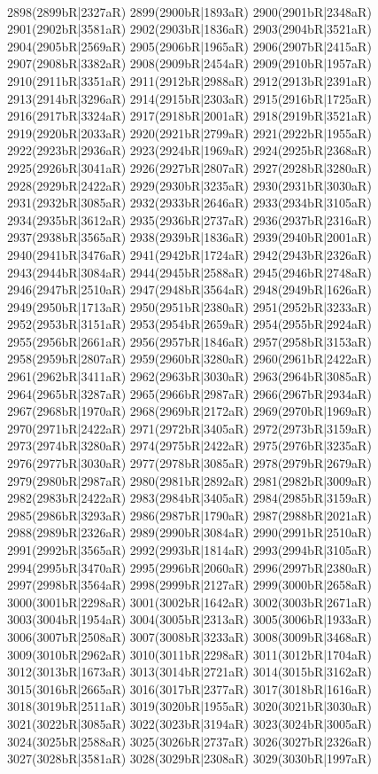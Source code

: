 \\2898(2899bR|2327aR) 2899(2900bR|1893aR) 2900(2901bR|2348aR) 2901(2902bR|3581aR) 2902(2903bR|1836aR) 2903(2904bR|3521aR) 2904(2905bR|2569aR) 2905(2906bR|1965aR) 2906(2907bR|2415aR) \\2907(2908bR|3382aR) 2908(2909bR|2454aR) 2909(2910bR|1957aR) 2910(2911bR|3351aR) 2911(2912bR|2988aR) 2912(2913bR|2391aR) 2913(2914bR|3296aR) 2914(2915bR|2303aR) 2915(2916bR|1725aR) \\2916(2917bR|3324aR) 2917(2918bR|2001aR) 2918(2919bR|3521aR) 2919(2920bR|2033aR) 2920(2921bR|2799aR) 2921(2922bR|1955aR) 2922(2923bR|2936aR) 2923(2924bR|1969aR) 2924(2925bR|2368aR) \\2925(2926bR|3041aR) 2926(2927bR|2807aR) 2927(2928bR|3280aR) 2928(2929bR|2422aR) 2929(2930bR|3235aR) 2930(2931bR|3030aR) 2931(2932bR|3085aR) 2932(2933bR|2646aR) 2933(2934bR|3105aR) \\2934(2935bR|3612aR) 2935(2936bR|2737aR) 2936(2937bR|2316aR) 2937(2938bR|3565aR) 2938(2939bR|1836aR) 2939(2940bR|2001aR) 2940(2941bR|3476aR) 2941(2942bR|1724aR) 2942(2943bR|2326aR) \\2943(2944bR|3084aR) 2944(2945bR|2588aR) 2945(2946bR|2748aR) 2946(2947bR|2510aR) 2947(2948bR|3564aR) 2948(2949bR|1626aR) 2949(2950bR|1713aR) 2950(2951bR|2380aR) 2951(2952bR|3233aR) \\2952(2953bR|3151aR) 2953(2954bR|2659aR) 2954(2955bR|2924aR) 2955(2956bR|2661aR) 2956(2957bR|1846aR) 2957(2958bR|3153aR) 2958(2959bR|2807aR) 2959(2960bR|3280aR) 2960(2961bR|2422aR) \\2961(2962bR|3411aR) 2962(2963bR|3030aR) 2963(2964bR|3085aR) 2964(2965bR|3287aR) 2965(2966bR|2987aR) 2966(2967bR|2934aR) 2967(2968bR|1970aR) 2968(2969bR|2172aR) 2969(2970bR|1969aR) \\2970(2971bR|2422aR) 2971(2972bR|3405aR) 2972(2973bR|3159aR) 2973(2974bR|3280aR) 2974(2975bR|2422aR) 2975(2976bR|3235aR) 2976(2977bR|3030aR) 2977(2978bR|3085aR) 2978(2979bR|2679aR) \\2979(2980bR|2987aR) 2980(2981bR|2892aR) 2981(2982bR|3009aR) 2982(2983bR|2422aR) 2983(2984bR|3405aR) 2984(2985bR|3159aR) 2985(2986bR|3293aR) 2986(2987bR|1790aR) 2987(2988bR|2021aR) \\2988(2989bR|2326aR) 2989(2990bR|3084aR) 2990(2991bR|2510aR) 2991(2992bR|3565aR) 2992(2993bR|1814aR) 2993(2994bR|3105aR) 2994(2995bR|3470aR) 2995(2996bR|2060aR) 2996(2997bR|2380aR) \\2997(2998bR|3564aR) 2998(2999bR|2127aR) 2999(3000bR|2658aR) 3000(3001bR|2298aR) 3001(3002bR|1642aR) 3002(3003bR|2671aR) 3003(3004bR|1954aR) 3004(3005bR|2313aR) 3005(3006bR|1933aR) \\3006(3007bR|2508aR) 3007(3008bR|3233aR) 3008(3009bR|3468aR) 3009(3010bR|2962aR) 3010(3011bR|2298aR) 3011(3012bR|1704aR) 3012(3013bR|1673aR) 3013(3014bR|2721aR) 3014(3015bR|3162aR) \\3015(3016bR|2665aR) 3016(3017bR|2377aR) 3017(3018bR|1616aR) 3018(3019bR|2511aR) 3019(3020bR|1955aR) 3020(3021bR|3030aR) 3021(3022bR|3085aR) 3022(3023bR|3194aR) 3023(3024bR|3005aR) \\3024(3025bR|2588aR) 3025(3026bR|2737aR) 3026(3027bR|2326aR) 3027(3028bR|3581aR) 3028(3029bR|2308aR) 3029(3030bR|1997aR) 